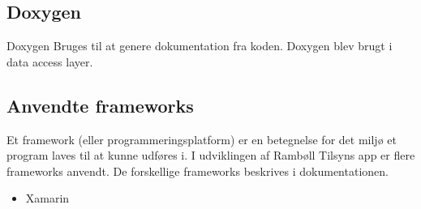 	\subsection*{Doxygen}
	Doxygen \cite{DoxygenInfo} Bruges til at genere dokumentation fra koden. Doxygen blev brugt i data access layer.   
	
	\subsection*{Anvendte frameworks} 
	Et framework (eller programmeringsplatform) er en betegnelse for det miljø 
	et program laves til at kunne udføres i. I udviklingen af Rambøll Tilsyns app
	er flere frameworks anvendt. De forskellige frameworks beskrives i dokumentationen.
	\begin{itemize}[-]
		\item Xamarin \cite{XamarinDoc}
					
	\end{itemize}
		
	